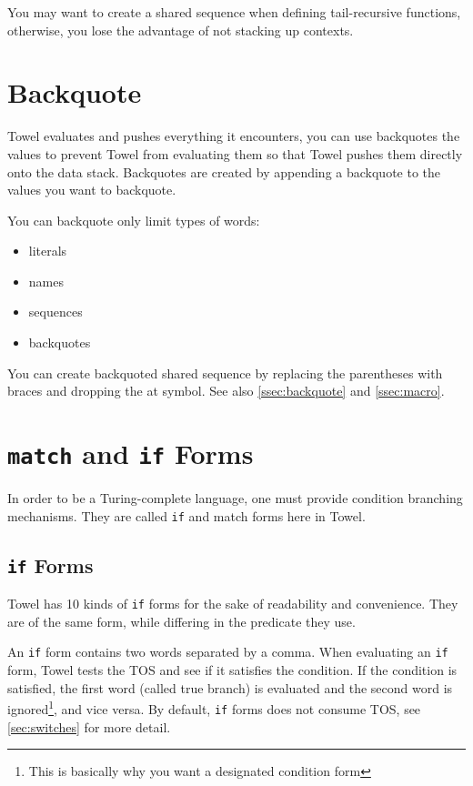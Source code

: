 \documentclass{book}
\begin{document}
You may want to create a shared sequence when defining tail-recursive functions, otherwise, you lose the advantage of not stacking up contexts.

\section{Backquote}

Towel evaluates and pushes everything it encounters, you can use backquotes the values to prevent Towel from evaluating them so that Towel pushes them directly onto the data stack. Backquotes are created by appending a backquote to the values you want to backquote.

You can backquote only limit types of words:
\begin{itemize}
\item literals
\item names
\item sequences
\item backquotes
\end{itemize}

You can create backquoted shared sequence by replacing the parentheses with braces and dropping the at symbol. See also \autoref{ssec:backquote} and \autoref{ssec:macro}.

\section{\texttt{match} and \texttt{if} Forms}

In order to be a Turing-complete language, one must provide condition branching mechanisms. They are called \texttt{if} and match forms here in Towel.

\subsection{\texttt{if} Forms}

Towel has 10 kinds of \texttt{if} forms for the sake of readability and convenience. They are of the same form, while differing in the predicate they use.

An \texttt{if} form contains two words separated by a comma. When evaluating an \texttt{if} form, Towel tests the TOS and see if it satisfies the condition. If the condition is satisfied, the first word (called true branch) is evaluated and the second word is ignored\footnote{This is basically why you want a designated condition form}, and vice versa. By default, \texttt{if} forms does not consume TOS, see \autoref{sec:switches} for more detail.
\end{document}
